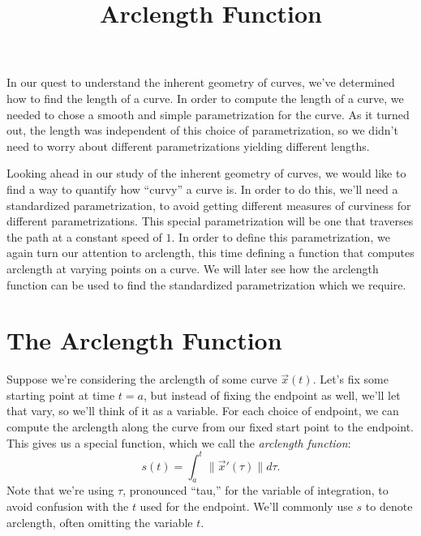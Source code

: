 \documentclass{ximera}
\title{Arclength Function}
\begin{document}
\begin{abstract}
\end{abstract}
\maketitle

In our quest to understand the inherent geometry of curves, we've determined how to find the length of a curve. In order to compute the length of a curve, we needed to chose a smooth and simple parametrization for the curve. As it turned out, the length was independent of this choice of parametrization, so we didn't need to worry about different parametrizations yielding different lengths.

Looking ahead in our study of the inherent geometry of curves, we would like to find a way to quantify how ``curvy'' a curve is. In order to do this, we'll need a standardized parametrization, to avoid getting different measures of curviness for different parametrizations. This special parametrization will be one that traverses the path at a constant speed of $1$. In order to define this parametrization, we again turn our attention to arclength, this time defining a function that computes arclength at varying points on a curve. We will later see how the arclength function can be used to find the standardized parametrization which we require.

\section*{The Arclength Function}

Suppose we're considering the arclength of some curve $\vec{x}(t)$. Let's fix some starting point at time $t=a$, but instead of fixing the endpoint as well, we'll let that vary, so we'll think of it as a variable. For each choice of endpoint, we can compute the arclength along the curve from our fixed start point to the endpoint. This gives us a special function, which we call the \emph{arclength function}:
\[
s(t) = \int_a^t \|\vec{x}'(\tau)\|d\tau.
\]
Note that we're using $\tau$, pronounced ``tau,'' for the variable of integration, to avoid confusion with the $t$ used for the endpoint. We'll commonly use $s$ to denote arclength, often omitting the variable $t$.

\begin{image}
\end{image}
\end{document}
